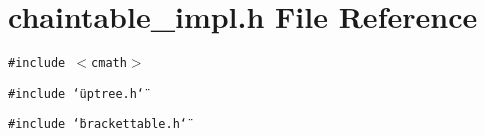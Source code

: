 \section{chaintable\_\-impl.h File Reference}
\label{chaintable__impl_8h}
{\tt \#include $<$cmath$>$}\par
{\tt \#include \char`\"{}uptree.h\char`\"{}}\par
{\tt \#include \char`\"{}brackettable.h\char`\"{}}\par
